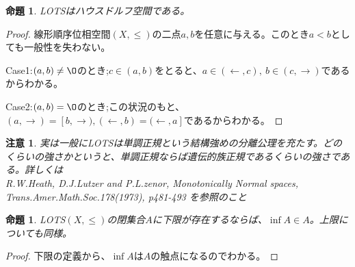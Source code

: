 \documentclass[leqno]{jsarticle}
\newtheorem{prop}[thm]{命題}
\newtheorem*{cau}{注意}
\begin{document}
\begin{prop}
LOTSはハウスドルフ空間である。
\end{prop}
\begin{proof}
線形順序位相空間$(X,\le)$の二点$a,b$を任意に与える。このとき$a<b$としても一般性を失わない。\par
Case1:$(a,b)\neq \O$のとき;$c\in (a,b)$をとると、$a\in (\gets, c),\ b\in(c,\to)$であるからわかる。\par
Case2:$(a,b)=\O$のとき;この状況のもと、$(a,\to)=[b,\to), (\gets, b)=(\gets, a]$であるからわかる。
\end{proof}
\begin{cau}\normalfont
実は一般にLOTSは単調正規という結構強めの分離公理を充たす。どのくらいの強さかというと、単調正規ならば遺伝的族正規であるくらいの強さである。詳しくは\\
 R.W.Heath, D.J.Lutzer and P.L.zenor, \textit{Monotonically Normal spaces}, Trans.Amer.Math.Soc.178(1973), p481-493
を参照のこと
\end{cau}

\begin{prop}
LOTS$(X,\le)$の閉集合$A$に下限が存在するならば、$\inf A\in A$。上限についても同様。
\end{prop}
\begin{proof}
下限の定義から、$\inf A$は$A$の触点になるのでわかる。
\end{proof}
\end{document}

